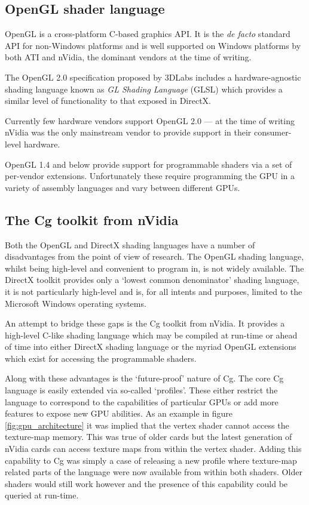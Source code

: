 \subsection{OpenGL shader language}

OpenGL\cite{GPU:OpenGLSpec} is a cross-platform C-based graphics API. 
It is the \emph{de facto} standard API for non-Windows platforms and
is well supported on Windows platforms by both ATI and nVidia, the dominant
vendors at the time of writing. 

The OpenGL 2.0 specification\cite{GPU:OpenGL2Overview} proposed by 3DLabs
includes a hardware-agnostic shading language\cite{GPU:OpenGLShadingLanguage}
known as \emph{GL Shading Language} (GLSL) which provides a similar level
of functionality to that exposed in DirectX. 

Currently few hardware vendors support OpenGL 2.0 --- at the time of writing
nVidia was the only mainstream vendor to provide support in their
consumer-level hardware\cite{nvidia:7664relnotes}.

OpenGL 1.4 and below provide support for programmable shaders via a set of per-vendor
extensions. Unfortunately these require programming the GPU in a variety of
assembly languages and vary between different GPUs.

\subsection{The Cg toolkit from nVidia}

Both the OpenGL and DirectX shading languages have a number of disadvantages
from the point of view of research. The OpenGL shading language, whilst being
high-level and convenient to program in, is not widely available. The
DirectX toolkit provides only a `lowest common denominator' shading language,
it is not particularly high-level and is, for all intents and purposes, limited
to the Microsoft Windows operating systems. 

An attempt to bridge these gaps is the Cg toolkit\cite{nvidia:cgtoolkit} from nVidia.
It provides a high-level C-like shading language which may be compiled at run-time or
ahead of time into either DirectX shading language or the myriad OpenGL extensions
which exist for accessing the programmable shaders. 

Along with these advantages is the `future-proof' nature of Cg. The core Cg language
is easily extended via so-called `profiles'. These either restrict the language to
correspond to the capabilities of particular GPUs or add more features to expose
new GPU abilities. As an example in figure \ref{fig:gpu_architecture} it was implied
that the vertex shader cannot access the texture-map memory. This was true
of older cards but the latest generation of nVidia cards can
access texture maps from within the vertex shader\cite{nvidia:sm3unleashed}. Adding this
capability to Cg was simply a case of releasing a new profile where texture-map related
parts of the language were now available from within both shaders. Older shaders
would still work however and the presence of this capability could be queried
at run-time.

